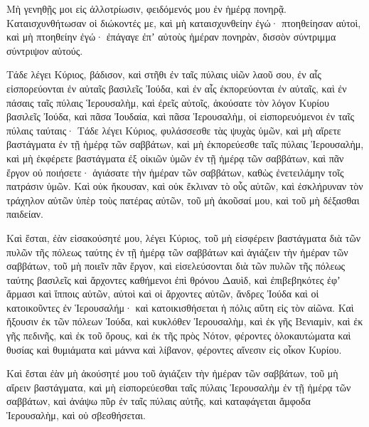 {Μὴ γενηθῇς μοι εἰς ἀλλοτρίωσιν, φειδόμενός μου ἐν ἡμέρᾳ πονηρᾷ.
Καταισχυνθήτωσαν οἱ διώκοντές με, καὶ μὴ καταισχυνθείην ἐγώ· πτοηθείησαν αὐτοὶ, καὶ μὴ πτοηθείην ἐγώ· ἐπάγαγε ἐπʼ αὐτοὺς ἡμέραν πονηρὰν, δισσὸν σύντριμμα σύντριψον αὐτούς.
\par }{\PP {}Τάδε λέγει Κύριος, βάδισον, καὶ στῆθι ἐν ταῖς πύλαις υἱῶν λαοῦ σου, ἐν αἷς εἰσπορεύονται ἐν αὐταῖς βασιλεῖς Ἰούδα, καὶ ἐν αἷς ἐκπορεύονται ἐν αὐταῖς, καὶ ἐν πάσαις ταῖς πύλαις Ἱερουσαλὴμ,
καὶ ἐρεῖς αὐτοῖς, ἀκούσατε τὸν λόγον Κυρίου βασιλεῖς Ἰούδα, καὶ πᾶσα Ἰουδαία, καὶ πᾶσα Ἱερουσαλὴμ, οἱ εἰσπορευόμενοι ἐν ταῖς πύλαις ταύταις·
Τάδε λέγει Κύριος, φυλάσσεσθε τὰς ψυχὰς ὑμῶν, καὶ μὴ αἴρετε βαστάγματα ἐν τῇ ἡμέρᾳ τῶν σαββάτων, καὶ μὴ ἐκπορεύεσθε ταῖς πύλαις Ἱερουσαλὴμ,
καὶ μὴ ἐκφέρετε βαστάγματα ἐξ οἰκιῶν ὑμῶν ἐν τῇ ἡμέρᾳ τῶν σαββάτων, καὶ πᾶν ἔργον οὐ ποιήσετε· ἁγιάσατε τὴν ἡμέραν τῶν σαββάτων, καθὼς ἐνετειλάμην τοῖς πατράσιν ὑμῶν. Καὶ οὐκ ἤκουσαν, καὶ οὐκ ἔκλιναν τὸ οὖς αὐτῶν,
καὶ ἐσκλήρυναν τὸν τράχηλον αὐτῶν ὑπὲρ τοὺς πατέρας αὐτῶν, τοῦ μὴ ἀκοῦσαί μου, καὶ τοῦ μὴ δέξασθαι παιδείαν.
\par }{\PP {}Καὶ ἕσται, ἐὰν εἰσακούσητέ μου, λέγει Κύριος, τοῦ μὴ εἰσφέρειν βαστάγματα διὰ τῶν πυλῶν τῆς πόλεως ταύτης ἐν τῇ ἡμέρᾳ τῶν σαββάτων καὶ ἁγιάζειν τὴν ἡμέραν τῶν σαββάτων, τοῦ μὴ ποιεῖν πᾶν ἔργον,
καὶ εἰσελεύσονται διὰ τῶν πυλῶν τῆς πόλεως ταύτης βασιλεῖς καὶ ἄρχοντες καθήμενοι ἐπὶ θρόνου Δαυὶδ, καὶ ἐπιβεβηκότες ἐφʼ ἅρμασι καὶ ἵπποις αὐτῶν, αὐτοὶ καὶ οἱ ἄρχοντες αὐτῶν, ἄνδρες Ἰούδα καὶ οἱ κατοικοῦντες ἐν Ἱερουσαλήμ· καὶ κατοικισθήσεται ἡ πόλις αὕτη εἰς τὸν αἰῶνα.
Καὶ ἥξουσιν ἐκ τῶν πόλεων Ἰούδα, καὶ κυκλόθεν Ἱερουσαλὴμ, καὶ ἐκ γῆς Βενιαμὶν, καὶ ἐκ γῆς πεδινῆς, καὶ ἐκ τοῦ ὄρους, καὶ ἐκ τῆς πρὸς Νότον, φέροντες ὁλοκαυτώματα καὶ θυσίας καὶ θυμιάματα καὶ μάννα καὶ λίβανον, φέροντες αἴνεσιν εἰς οἶκον Κυρίου.
\par }{\PP {}Καὶ ἔσται ἐὰν μὴ ἀκούσητέ μου τοῦ ἁγιάζειν τὴν ἡμέραν τῶν σαββάτων, τοῦ μὴ αἴρειν βαστάγματα, καὶ μὴ εἰσπορεύεσθαι ταῖς πύλαις Ἱερουσαλὴμ ἐν τῇ ἡμέρᾳ τῶν σαββάτων, καὶ ἀνάψω πῦρ ἐν ταῖς πύλαις αὐτῆς, καὶ καταφάγεται ἄμφοδα Ἱερουσαλὴμ, καὶ οὐ σβεσθήσεται.

}
